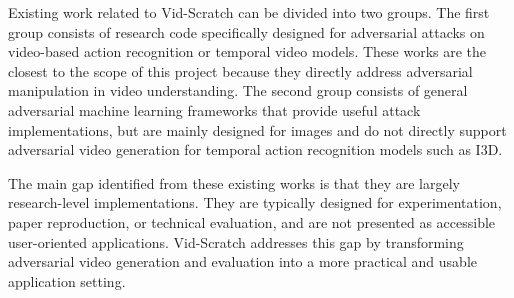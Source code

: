 Existing work related to Vid-Scratch can be divided into two groups. The first group consists of research code specifically designed for adversarial attacks on video-based action recognition or temporal video models. These works are the closest to the scope of this project because they directly address adversarial manipulation in video understanding. The second group consists of general adversarial machine learning frameworks that provide useful attack implementations, but are mainly designed for images and do not directly support adversarial video generation for temporal action recognition models such as I3D.

The main gap identified from these existing works is that they are largely research-level implementations. They are typically designed for experimentation, paper reproduction, or technical evaluation, and are not presented as accessible user-oriented applications. Vid-Scratch addresses this gap by transforming adversarial video generation and evaluation into a more practical and usable application setting.

